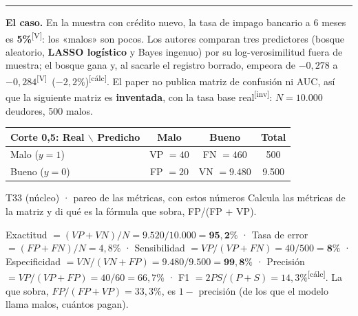 \documentclass[10pt,a4paper]{article}
\newcommand{\V}{\textsuperscript{\textcolor{green!45!black}{[V]}}}
\newcommand{\inv}{\textsuperscript{\textcolor{red!60!black}{[inv]}}}
\newcommand{\calc}{\textsuperscript{\textcolor{blue!60!black}{[cálc]}}}
\newcommand{\acto}[1]{\vspace{6pt}{\large\bfseries #1}\par\vspace{2pt}\hrule\vspace{4pt}}
\begin{document}
\acto{Acto 2. ¿Sirve el modelo para separar? Clasificación con tasa base baja}

\textbf{El caso.} En la muestra con crédito nuevo, la tasa de impago bancario a 6 meses es \textbf{5\%}\V: los «malos» son pocos. Los autores comparan tres predictores (bosque aleatorio, \textbf{LASSO logístico} y Bayes ingenuo) por su log-verosimilitud fuera de muestra; el bosque gana y, al sacarle el registro borrado, empeora de $-0{,}278$ a $-0{,}284$\V\ ($-2{,}2\%$)\calc. El paper no publica matriz de confusión ni AUC, así que la siguiente matriz es \textbf{inventada}, con la tasa base real\inv: $N=10.000$ deudores, 500 malos.
\begin{center}\small
\begin{tabular}{lcc|c}\toprule
Corte 0,5: Real $\backslash$ Predicho & Malo & Bueno & Total\\\midrule
Malo ($y=1$) & VP $=40$ & FN $=460$ & 500\\
Bueno ($y=0$) & FP $=20$ & VN $=9.480$ & 9.500\\\bottomrule
\end{tabular}
\end{center}

\begin{enun}{T33 (núcleo) · pareo de las métricas, con estos números}
Calcula las métricas de la matriz y di qué es la fórmula que sobra, FP/(FP + VP).
\end{enun}
\begin{ejemplar}
Exactitud $=(VP+VN)/N=9.520/10.000=\mathbf{95{,}2\%}$ · Tasa de error $=(FP+FN)/N=4{,}8\%$ · Sensibilidad $=VP/(VP+FN)=40/500=\mathbf{8\%}$ · Especificidad $=VN/(VN+FP)=9.480/9.500=\mathbf{99{,}8\%}$ · Precisión $=VP/(VP+FP)=40/60=66{,}7\%$ · F1 $=2PS/(P+S)=14{,}3\%$\calc. La que sobra, $FP/(FP+VP)=33{,}3\%$, es $1-$ precisión (de los que el modelo llama malos, cuántos pagan).
\end{ejemplar}
\end{document}
